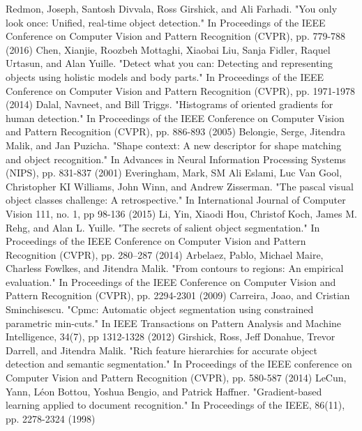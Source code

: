 \begin{thebibliography}{}
Redmon, Joseph, Santosh Divvala, Ross Girshick, and Ali Farhadi. "You only look once: Unified, real-time object detection." In Proceedings of the IEEE Conference on Computer Vision and Pattern Recognition (CVPR), pp. 779-788 (2016)
%
Chen, Xianjie, Roozbeh Mottaghi, Xiaobai Liu, Sanja Fidler, Raquel Urtasun, and Alan Yuille. "Detect what you can: Detecting and representing objects using holistic models and body parts." In Proceedings of the IEEE Conference on Computer Vision and Pattern Recognition (CVPR), pp. 1971-1978 (2014)
%
Dalal, Navneet, and Bill Triggs. "Histograms of oriented gradients for human detection." In Proceedings of the IEEE Conference on Computer Vision and Pattern Recognition (CVPR), pp. 886-893 (2005)
Belongie, Serge, Jitendra Malik, and Jan Puzicha. "Shape context: A new descriptor for shape matching and object recognition." In Advances in Neural Information Processing Systems (NIPS), pp. 831-837 (2001)
Everingham, Mark, SM Ali Eslami, Luc Van Gool, Christopher KI Williams, John Winn, and Andrew Zisserman. "The pascal visual object classes challenge: A retrospective." In International Journal of Computer Vision 111, no. 1, pp 98-136 (2015)
Li, Yin, Xiaodi Hou, Christof Koch, James M. Rehg, and Alan L. Yuille. "The secrets of salient object segmentation." In Proceedings of the IEEE Conference on Computer Vision and Pattern Recognition (CVPR), pp. 280–287 (2014)
%
Arbelaez, Pablo, Michael Maire, Charless Fowlkes, and Jitendra Malik. "From contours to regions: An empirical evaluation." In Proceedings of the IEEE Conference on Computer Vision and Pattern Recognition (CVPR), pp. 2294-2301 (2009)
Carreira, Joao, and Cristian Sminchisescu. "Cpmc: Automatic object segmentation using constrained parametric min-cuts." In IEEE Transactions on Pattern Analysis and Machine Intelligence, 34(7), pp 1312-1328 (2012)
Girshick, Ross, Jeff Donahue, Trevor Darrell, and Jitendra Malik. "Rich feature hierarchies for accurate object detection and semantic segmentation." In Proceedings of the IEEE conference on Computer Vision and Pattern Recognition (CVPR), pp. 580-587 (2014)
LeCun, Yann, Léon Bottou, Yoshua Bengio, and Patrick Haffner. "Gradient-based learning applied to document recognition." In Proceedings of the IEEE, 86(11), pp. 2278-2324 (1998)

\end{thebibliography}



